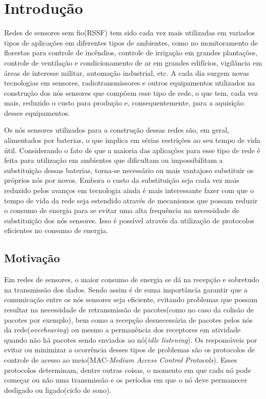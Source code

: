 \chapter{Introdução}

Redes de sensores sem fio(RSSF) tem sido cada vez mais utilizadas em variados tipos de aplicações em diferentes tipos de ambientes, como no monitoramento de florestas para controle de incêndios, controle de irrigação em grandes plantações, controle de ventilação e condicionamento de ar em grandes edifícios, vigilância em áreas de interesse militar, automação industrial, etc. A cada dia surgem novas tecnologias em sensores, radiotransmissores e outros equipamentos utilizados na construção dos nós sensores que compõem esse tipo de rede, o que tem, cada vez mais, reduzido o custo para produção e, consequentemente, para a aquisição desses equipamentos.

Os nós sensores utilizados para a construção dessas redes são, em geral, alimentados por baterias, o que implica em sérias restrições ao seu tempo de vida útil. Considerando o fato de que a maioria das aplicações para esse tipo de rede é feita para utilização em ambientes que dificultam ou impossibilitam a substituição dessas baterias, torna-se necessário ou mais vantajoso substituir os próprios nós por novos. Embora o custo da substituição seja cada vez mais reduzido pelos avanços em tecnologia ainda é mais interessante fazer com que o tempo de vida da rede seja estendido através de mecanismos que possam reduzir o consumo de energia para se evitar uma alta frequência na necessidade de substituição dos nós sensores. Isso é possível através da utilização de protocolos eficientes no consumo de energia. 

\section{Motivação}

Em redes de sensores, o maior consumo de energia se dá na recepção e sobretudo na transmissão dos dados. Sendo assim é de suma importância garantir que a comunicação entre os nós sensores seja eficiente, evitando problemas que possam resultar na necessidade de retransmissão de pacotes(como no caso da colisão de pacotes por exemplo), bem como a recepção desnecessária de pacotes pelos nós da rede(\emph{overhearing}) ou mesmo a permanência dos receptores em atividade quando não há pacotes sendo enviados ao nó(\emph{idle listening}). Os responsáveis por evitar ou minimizar a ocorrência desses tipos de problemas são os protocolos de controle de acesso ao meio(MAC-\emph{Medium Access Control Protocols}). Esses protocolos determinam, dentre outras coisas, o momento em que cada nó pode começar ou não uma transmissão e os períodos em que o nó deve permanecer desligado ou ligado(ciclo de sono).

